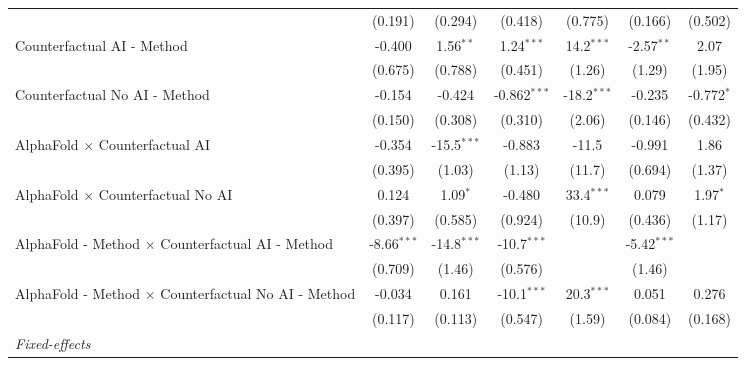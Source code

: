 \begin{tabular}{lcccccc}
                                                              & (0.191)       & (0.294)       & (0.418)        & (0.775)       & (0.166)       & (0.502)\\   
   Counterfactual AI - Method                                 & -0.400        & 1.56$^{**}$   & 1.24$^{***}$   & 14.2$^{***}$  & -2.57$^{**}$  & 2.07\\   
                                                              & (0.675)       & (0.788)       & (0.451)        & (1.26)        & (1.29)        & (1.95)\\   
   Counterfactual No AI - Method                              & -0.154        & -0.424        & -0.862$^{***}$ & -18.2$^{***}$ & -0.235        & -0.772$^{*}$\\   
                                                              & (0.150)       & (0.308)       & (0.310)        & (2.06)        & (0.146)       & (0.432)\\   
   AlphaFold $\times$ Counterfactual AI                       & -0.354        & -15.5$^{***}$ & -0.883         & -11.5         & -0.991        & 1.86\\   
                                                              & (0.395)       & (1.03)        & (1.13)         & (11.7)        & (0.694)       & (1.37)\\   
   AlphaFold $\times$ Counterfactual No AI                    & 0.124         & 1.09$^{*}$    & -0.480         & 33.4$^{***}$  & 0.079         & 1.97$^{*}$\\   
                                                              & (0.397)       & (0.585)       & (0.924)        & (10.9)        & (0.436)       & (1.17)\\   
   AlphaFold - Method $\times$ Counterfactual AI - Method     & -8.66$^{***}$ & -14.8$^{***}$ & -10.7$^{***}$  &               & -5.42$^{***}$ &   \\   
                                                              & (0.709)       & (1.46)        & (0.576)        &               & (1.46)        &   \\   
   AlphaFold - Method $\times$ Counterfactual No AI - Method  & -0.034        & 0.161         & -10.1$^{***}$  & 20.3$^{***}$  & 0.051         & 0.276\\   
                                                              & (0.117)       & (0.113)       & (0.547)        & (1.59)        & (0.084)       & (0.168)\\   
   \midrule
   \emph{Fixed-effects}\\

\end{tabular}
